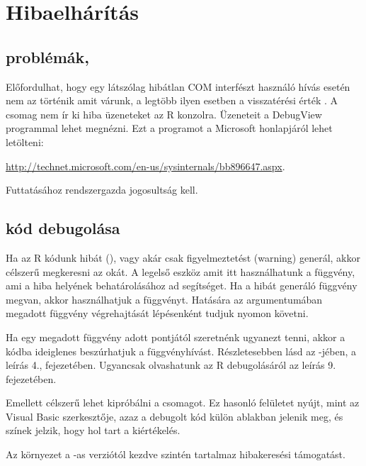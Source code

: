 
\chapter{Hibaelhárítás}\label{chap:8}

\section{ problémák, }\label{sec:8.1} 

 
Előfordulhat, hogy egy látszólag hibátlan COM interfészt használó
hívás esetén nem az történik amit várunk, a legtöbb ilyen esetben a
visszatérési érték . A  csomag nem ír ki hiba
üzeneteket az R konzolra. Üzeneteit a 
DebugView programmal lehet megnézni. Ezt a programot a Microsoft
honlapjáról lehet letölteni:
\begin{center}
  \url{http://technet.microsoft.com/en-us/sysinternals/bb896647.aspx}.
\end{center}
Futtatásához rendszergazda jogosultság kell.

\section{ kód debugolása}\label{sec:8.2}
Ha az R kódunk hibát (), vagy akár csak figyelmeztetést
(warning)  generál, akkor célszerű
megkeresni az okát. A legelső eszköz amit itt használhatunk a
 függvény, ami a 
hiba helyének behatárolásához ad segítséget. Ha a hibát generáló
függvény megvan, akkor 
használhatjuk a  függvényt. Hatására az argumentumában
megadott függvény végrehajtását lépésenként tudjuk nyomon követni. 

Ha egy megadott függvény adott pontjától 
szeretnénk ugyanezt tenni, akkor a kódba ideiglenes beszúrhatjuk a
 függvényhívást. Részletesebben lásd az -jében,  a  leírás 4., 
fejezetében. Ugyancsak olvashatunk az R debugolásáról az  leírás 9. 
fejezetében.

Emellett célszerű lehet kipróbálni a  csomagot. Ez hasonló
felületet nyújt, mint az 
 Visual Basic szerkesztője, azaz a debugolt kód külön ablakban
jelenik meg, és színek 
jelzik, hogy hol tart a kiértékelés.

Az  környezet a -as verziótól kezdve szintén
tartalmaz hibakeresési támogatást. 


